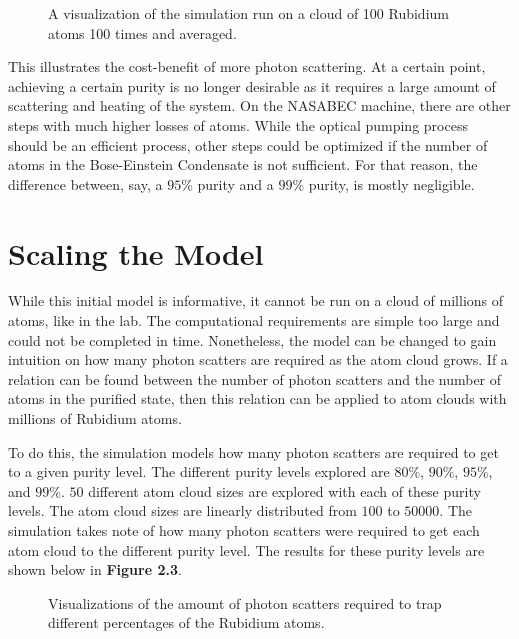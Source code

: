 \begin{figure}[h!]
\begin{center}
\end{center}
\caption{A visualization of the simulation run on a cloud of 100 Rubidium atoms 100 times and averaged. }
\end{figure}

This illustrates the cost-benefit of more photon scattering. At a certain point, achieving a certain purity is no longer desirable as it requires a large amount of scattering and heating of the system. On the NASABEC machine, there are other steps with much higher losses of atoms. While the optical pumping process should be an efficient process, other steps could be optimized if the number of atoms in the Bose-Einstein Condensate is not sufficient. For that reason, the difference between, say, a $95\%$ purity and a $99\%$ purity, is mostly negligible. 
\newline

\section{Scaling the Model}

While this initial model is informative, it cannot be run on a cloud of millions of atoms, like in the lab. The computational requirements are simple too large and could not be completed in time. Nonetheless, the model can be changed to gain intuition on how many photon scatters are required as the atom cloud grows. If a relation can be found between the number of photon scatters and the number of atoms in the purified state, then this relation can be applied to atom clouds with millions of Rubidium atoms. 

To do this, the simulation models how many photon scatters are required to get to a given purity level. The different purity levels explored are $80\%$, $90\%$, $95\%$, and $99\%$. $50$ different atom cloud sizes are explored with each of these purity levels. The atom cloud sizes are linearly distributed from $100$ to $50000$. The simulation takes note of how many photon scatters were required to get each atom cloud to the different purity level. The results for these purity levels are shown below in \textbf{Figure 2.3}.

\begin{figure}[h!]
\begin{center}
\end{center}
\caption{Visualizations of the amount of photon scatters required to trap different percentages of the Rubidium atoms. }
\end{figure}

